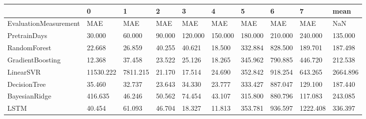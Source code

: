 \begin{tabular}{llllllllll}
\toprule
{} &         0 &        1 &      2 &       3 &       4 &       5 &       6 &        7 &     mean \\
\midrule
EvaluationMeasurement &       MAE &      MAE &    MAE &     MAE &     MAE &     MAE &     MAE &      MAE &      NaN \\
PretrainDays          &    30.000 &   60.000 & 90.000 & 120.000 & 150.000 & 180.000 & 210.000 &  240.000 &  135.000 \\
RandomForest          &    22.668 &   26.859 & 40.255 &  40.621 &  18.500 & 332.884 & 828.500 &  189.701 &  187.498 \\
GradientBoosting      &    12.368 &   37.458 & 23.522 &  25.126 &  18.265 & 345.962 & 790.885 &  446.720 &  212.538 \\
LinearSVR             & 11530.222 & 7811.215 & 21.170 &  17.514 &  24.690 & 352.842 & 918.254 &  643.265 & 2664.896 \\
DecisionTree          &    35.460 &   32.737 & 23.643 &  34.330 &  23.777 & 333.427 & 887.047 &  129.100 &  187.440 \\
BayesianRidge         &   416.635 &   46.246 & 50.562 &  74.454 &  43.107 & 315.800 & 880.796 &  117.083 &  243.085 \\
LSTM                  &    40.454 &   61.093 & 46.704 &  18.327 &  11.813 & 353.781 & 936.597 & 1222.408 &  336.397 \\
\bottomrule
\end{tabular}
